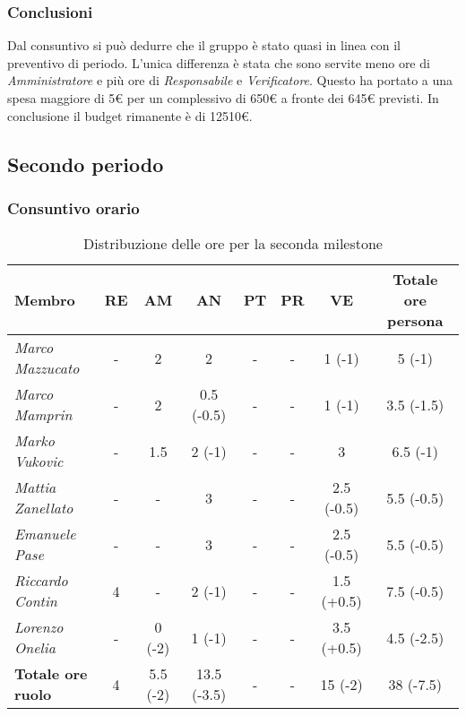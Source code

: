 \subsubsection{Conclusioni}
Dal consuntivo si può dedurre che il gruppo è stato quasi in linea con il preventivo di periodo.
L'unica differenza è stata che sono servite meno ore di \textit{Amministratore} e più
ore di \textit{Responsabile} e \textit{Verificatore}. Questo ha portato a una spesa maggiore di 5€ per un
complessivo di 650€ a fronte dei 645€ previsti.
In conclusione il budget rimanente è di \num{12510}€.



\subsection{Secondo periodo}

\subsubsection{Consuntivo orario}
\begin{table}[H]
    \centering
    \begin{tabular}{|l|c|c|c|c|c|c|c|}
    \hline
    \textbf{Membro} & \multicolumn{1}{c|}{\textbf{RE}} & \multicolumn{1}{c|}{\textbf{AM}} & \multicolumn{1}{c|}{\textbf{AN}} & \multicolumn{1}{c|}{\textbf{PT}} & \multicolumn{1}{c|}{\textbf{PR}} & \multicolumn{1}{c|}{\textbf{VE}} & \multicolumn{1}{c|}{\textbf{Totale ore persona}} \\ \hline
    \textit{Marco Mazzucato}  & -      & 2            & 2          & - & - & 1 (-1)        & 5 (-1)         \\ \hline
    \textit{Marco Mamprin}    & -      & 2            & 0.5 (-0.5)   & - & - & 1 (-1)        & 3.5 (-1.5)       \\ \hline
    \textit{Marko Vukovic}    & -      & 1.5          & 2 (-1)     & - & - & 3             & 6.5 (-1)       \\ \hline
    \textit{Mattia Zanellato} & -      & -            & 3          & - & - & 2.5 (-0.5)      & 5.5 (-0.5)       \\ \hline
    \textit{Emanuele Pase}    & -      & -            & 3          & - & - & 2.5 (-0.5)      & 5.5 (-0.5)       \\ \hline
    \textit{Riccardo Contin}  & 4      & -            & 2 (-1)     & - & - & 1.5 (+0.5)      & 7.5 (-0.5)       \\ \hline
    \textit{Lorenzo Onelia}   & -      & 0 (-2)       & 1 (-1)     & - & - & 3.5 (+0.5)      & 4.5 (-2.5)       \\ \hline
    \textbf{Totale ore ruolo} & 4      & 5.5 (-2)     & 13.5 (-3.5)  & - & - & 15 (-2)       & 38 (-7.5)    \\ \hline
    \end{tabular}
    \caption{Distribuzione delle ore per la seconda milestone}
\end{table}

